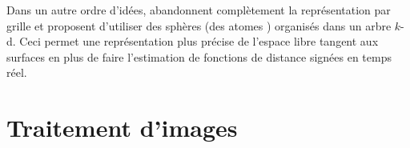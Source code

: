 Dans un autre ordre d'idées, \cite{Fridovich-Keil2017AtomMap} abandonnent complètement la représentation par grille et proposent d'utiliser des sphères (des \guillemotleft atomes \guillemotright) organisés dans un arbre $k$-d. Ceci permet une représentation plus précise de l'espace libre tangent aux surfaces en plus de faire l'estimation de fonctions de distance signées en temps réel.



\section{Traitement d'images}

